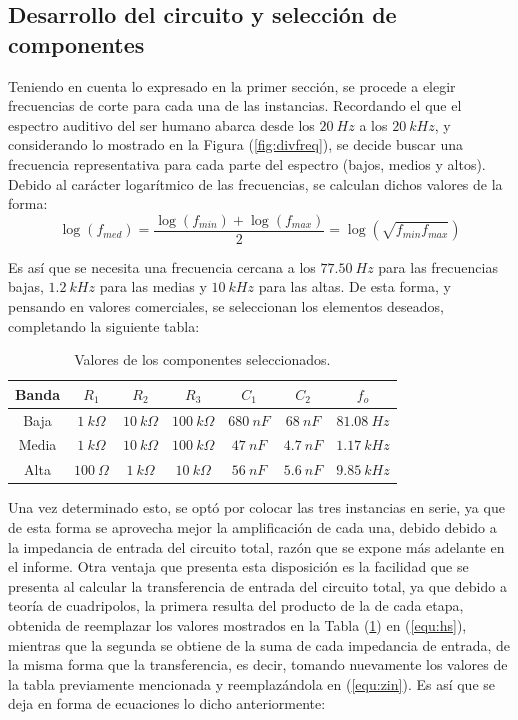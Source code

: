 \documentclass[a4paper]{article}
\begin{document}
\subsection{Desarrollo del circuito y selección de componentes}

Teniendo en cuenta lo expresado en la primer sección, se procede a elegir frecuencias de corte para cada una de las instancias. Recordando el que el espectro auditivo del ser humano abarca desde los $20 \ Hz$ a los $20 \ kHz$, y considerando lo mostrado en la Figura (\ref{fig:divfreq}), se decide buscar una frecuencia representativa para cada parte del espectro (bajos, medios y altos). Debido al carácter logarítmico de las frecuencias, se calculan dichos valores de la forma:
\begin{equation*}
	\log{(f_{med})} = \frac{\log(f_{min}) + \log(f_{max})}{2} = \log(\sqrt{f_{min} f_{max}})
\end{equation*}

Es así que se necesita una frecuencia cercana a los $77.50 \ Hz$ para las frecuencias bajas, $1.2 \ kHz$ para las medias y $10 \ kHz$ para las altas. De esta forma, y pensando en valores comerciales, se seleccionan los elementos deseados, completando la siguiente tabla:

\begin{table}[H]
\begin{center}
\begin{tabular}{ccccccc}
\hline
Banda & $R_1$ & $R_2$ & $R_3$ & $C_1$ & $C_2$ & $f_o$ \\
\hline
Baja & $1 \ k\Omega$ & $10 \ k\Omega$ & $100 \ k\Omega$ & $680 \ nF$ & $68 \ nF$ & $81.08 \ Hz$ \\
Media & $1 \ k\Omega$ & $10 \ k\Omega$ & $100 \ k\Omega$ & $47 \ nF$ & $4.7 \ nF$ & $1.17 \ kHz$ \\
Alta & $100 \ \Omega$ & $1 \ k\Omega$ & $10 \ k\Omega$ & $56 \ nF$ & $5.6 \ nF$ & $9.85 \ kHz$\\
\hline
\end{tabular}
\caption{Valores de los componentes seleccionados.}
\label{tabla:valores}
\end{center}
\end{table}

Una vez determinado esto, se optó por colocar las tres instancias en serie, ya que de esta forma se aprovecha mejor la amplificación de cada una, debido debido a la impedancia de entrada del circuito total, razón que se expone más adelante en el informe. Otra ventaja que presenta esta disposición es la facilidad que se presenta al calcular la transferencia de entrada del circuito total, ya que debido a teoría de cuadripolos, la primera resulta del producto de la de cada etapa, obtenida de reemplazar los valores mostrados en la Tabla (\ref{tabla:valores}) en (\ref{equ:hs}), mientras que la segunda se obtiene de la suma de cada impedancia de entrada, de la misma forma que la transferencia, es decir, tomando nuevamente los valores de la tabla previamente mencionada y reemplazándola en (\ref{equ:zin}). Es así que se deja en forma de ecuaciones lo dicho anteriormente:
\end{document}
